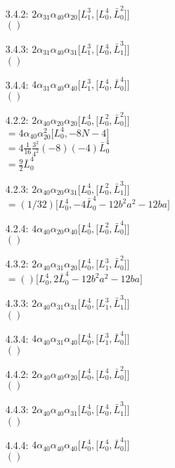 \documentclass{article}
\newcommand{\lrbrack}[2]{\lbrack #1 , #2 \rbrack}
\begin{document}
\begin{itemize}
\item[3.4.2:] $2\alpha_{31}\alpha_{40}\alpha_{20} \lrbrack{L_1^3}{\lrbrack{L_0^4}{\bar{L}_0^2}}$\\
$()$\\
\item[3.4.3:] $2\alpha_{31}\alpha_{40}\alpha_{31} \lrbrack{L_1^3}{\lrbrack{L_0^4}{\bar{L}_1^3}}$\\
$()$\\
\item[3.4.4:] $4\alpha_{31}\alpha_{40}\alpha_{40} \lrbrack{L_1^3}{\lrbrack{L_0^4}{\bar{L}_0^4}}$\\
$()$\\
\item[4.2.2:] $2\alpha_{40}\alpha_{20}\alpha_{20} \lrbrack{L_0^4}{\lrbrack{L_0^2}{\bar{L}_0^2}}$\\
$ = 4\alpha_{40}\alpha_{20}^2\lrbrack{L_0^4}{-8N-4} $\\
$ = 4\frac{1}{16}\frac{3^2}{4^2} (-8)(-4)\bar{L}_0^4$\\
$ = \frac{9}{2} \bar{L}_0^4 $\\
\item[4.2.3:] $2\alpha_{40}\alpha_{20}\alpha_{31} \lrbrack{L_0^4}{\lrbrack{L_0^2}{\bar{L}_1^3}}$\\
$= (1/32)\lrbrack{L_0^4}{-4\bar{L}_0^4-12b^2a^2 -12 ba} $\\
\item[4.2.4:] $4\alpha_{40}\alpha_{20}\alpha_{40} \lrbrack{L_0^4}{\lrbrack{L_0^2}{\bar{L}_0^4}}$\\
$()$\\
\item[4.3.2:] $2\alpha_{40}\alpha_{31}\alpha_{20} \lrbrack{L_0^4}{\lrbrack{L_1^3}{\bar{L}_0^2}}$\\
$ = () \lrbrack{L_0^4}{2\bar{L}_0^4-12b^2a^2 -12 ba} $\\
\item[4.3.3:] $2\alpha_{40}\alpha_{31}\alpha_{31} \lrbrack{L_0^4}{\lrbrack{L_1^3}{\bar{L}_1^3}}$\\
$()$\\
\item[4.3.4:] $4\alpha_{40}\alpha_{31}\alpha_{40} \lrbrack{L_0^4}{\lrbrack{L_1^3}{\bar{L}_0^4}}$\\
$()$\\
\item[4.4.2:] $2\alpha_{40}\alpha_{40}\alpha_{20} \lrbrack{L_0^4}{\lrbrack{L_0^4}{\bar{L}_0^2}}$\\
$()$\\
\item[4.4.3:] $2\alpha_{40}\alpha_{40}\alpha_{31} \lrbrack{L_0^4}{\lrbrack{L_0^4}{\bar{L}_1^3}}$\\
$()$\\
\item[4.4.4:] $4\alpha_{40}\alpha_{40}\alpha_{40} \lrbrack{L_0^4}{\lrbrack{L_0^4}{\bar{L}_0^4}}$\\
$()$\\
\end{itemize}
\end{document}
